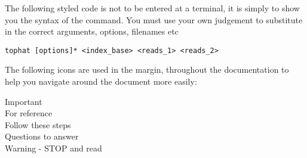 The following styled code is not to be entered at a terminal, it is simply to show you the syntax of
the command. You must use your own judgement to substitute in the correct arguments, options,
filenames etc

\begin{lstlisting}[style=command_syntax]
tophat [options]* <index_base> <reads_1> <reads_2>
\end{lstlisting}

The following icons are used in the margin, throughout the documentation to help you navigate around
the document more easily:

\hspace*{.2cm} Important\\
\hspace*{.2cm} For reference\\
\hspace*{.2cm} Follow these steps\\
\hspace*{.2cm} Questions to answer\\
\hspace*{.2cm} Warning - STOP and read\\

